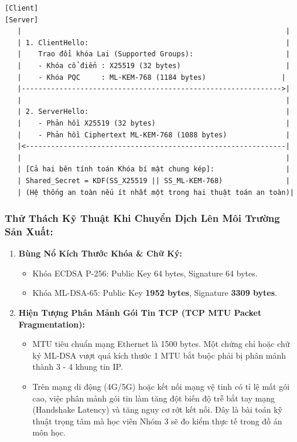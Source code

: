 \documentclass[
]{article}
\providecommand{\tightlist}{%
  \setlength{\itemsep}{0pt}\setlength{\parskip}{0pt}}
\begin{document}
\begin{verbatim}
[Client]                                                        [Server]
   |                                                               |
   | 1. ClientHello:                                               |
   |    Trao đổi khóa Lai (Supported Groups):                      |
   |    - Khóa cổ điển : X25519 (32 bytes)                         |
   |    - Khóa PQC     : ML-KEM-768 (1184 bytes)                  |
   |-------------------------------------------------------------->|
   |                                                               |
   | 2. ServerHello:                                               |
   |    - Phản hồi X25519 (32 bytes)                               |
   |    - Phản hồi Ciphertext ML-KEM-768 (1088 bytes)              |
   |<--------------------------------------------------------------|
   |                                                               |
   | [Cả hai bên tính toán Khóa bí mật chung kép]:                 |
   | Shared_Secret = KDF(SS_X25519 || SS_ML-KEM-768)               |
   | (Hệ thống an toàn nếu ít nhất một trong hai thuật toán an toàn)|
\end{verbatim}

\subsubsection{Thử Thách Kỹ Thuật Khi Chuyển Dịch Lên Môi Trường Sản
Xuất:}\label{thux1eed-thuxe1ch-kux1ef9-thuux1eadt-khi-chuyux1ec3n-dux1ecbch-luxean-muxf4i-trux1b0ux1eddng-sux1ea3n-xuux1ea5t}

\begin{enumerate}
\def\labelenumi{\arabic{enumi}.}
\tightlist
\item
  \textbf{Bùng Nổ Kích Thước Khóa \& Chữ Ký:}

  \begin{itemize}
  \tightlist
  \item
    Khóa ECDSA P-256: Public Key 64 bytes, Signature 64 bytes.
  \item
    Khóa ML-DSA-65: Public Key \textbf{1952 bytes}, Signature
    \textbf{3309 bytes}.
  \end{itemize}
\item
  \textbf{Hiện Tượng Phân Mảnh Gói Tin TCP (TCP MTU Packet
  Fragmentation):}

  \begin{itemize}
  \tightlist
  \item
    MTU tiêu chuẩn mạng Ethernet là 1500 bytes. Một chứng chỉ hoặc chữ
    ký ML-DSA vượt quá kích thước 1 MTU bắt buộc phải bị phân mảnh thành
    3 - 4 khung tin IP.
  \item
    Trên mạng di động (4G/5G) hoặc kết nối mạng vệ tinh có tỉ lệ mất gói
    cao, việc phân mảnh gói tin làm tăng đột biến độ trễ bắt tay mạng
    (Handshake Latency) và tăng nguy cơ rớt kết nối. Đây là bài toán kỹ
    thuật trọng tâm mà học viên Nhóm 3 sẽ đo kiểm thực tế trong đồ án
    môn học.
  \end{itemize}
\end{enumerate}
\end{document}
